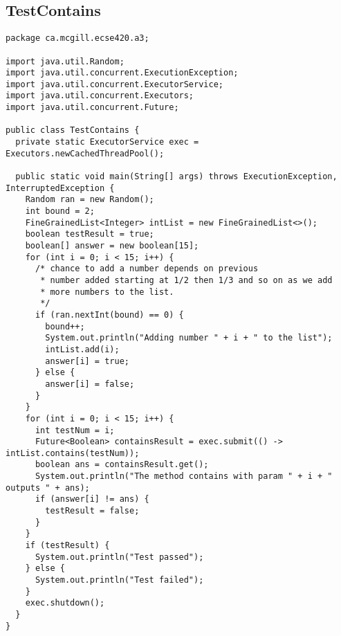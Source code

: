\documentclass[11pt,letterpaper]{exam}
\begin{document}
    \subsection{TestContains}
	\begin{lstlisting}
package ca.mcgill.ecse420.a3;

import java.util.Random;
import java.util.concurrent.ExecutionException;
import java.util.concurrent.ExecutorService;
import java.util.concurrent.Executors;
import java.util.concurrent.Future;

public class TestContains {
  private static ExecutorService exec = Executors.newCachedThreadPool();

  public static void main(String[] args) throws ExecutionException, InterruptedException {
    Random ran = new Random();
    int bound = 2;
    FineGrainedList<Integer> intList = new FineGrainedList<>();
    boolean testResult = true;
    boolean[] answer = new boolean[15];
    for (int i = 0; i < 15; i++) {
      /* chance to add a number depends on previous
       * number added starting at 1/2 then 1/3 and so on as we add
       * more numbers to the list.
       */
      if (ran.nextInt(bound) == 0) {
        bound++;
        System.out.println("Adding number " + i + " to the list");
        intList.add(i);
        answer[i] = true;
      } else {
        answer[i] = false;
      }
    }
    for (int i = 0; i < 15; i++) {
      int testNum = i;
      Future<Boolean> containsResult = exec.submit(() -> intList.contains(testNum));
      boolean ans = containsResult.get();
      System.out.println("The method contains with param " + i + " outputs " + ans);
      if (answer[i] != ans) {
        testResult = false;
      }
    }
    if (testResult) {
      System.out.println("Test passed");
    } else {
      System.out.println("Test failed");
    }
    exec.shutdown();
  }
}
	\end{lstlisting}
\end{document}
